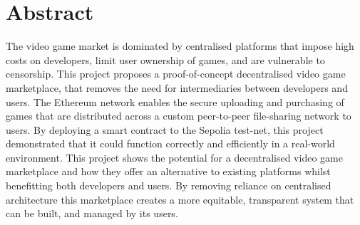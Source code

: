 \section*{Abstract}

The video game market is dominated by centralised platforms that impose high costs on developers, limit user ownership of games, and are vulnerable to censorship. This project proposes a proof-of-concept decentralised video game marketplace, that removes the need for intermediaries between developers and users. 
The Ethereum network enables the secure uploading and purchasing of games that are distributed across a custom peer-to-peer file-sharing network to users. By deploying a smart contract to the Sepolia test-net, this project demonstrated that it could function correctly and efficiently in a real-world environment.
\x
This project shows the potential for a decentralised video game marketplace and how they offer an alternative to existing platforms whilst benefitting both developers and users. By removing reliance on centralised architecture this marketplace creates a more equitable, transparent system that can be built, and managed by its users.